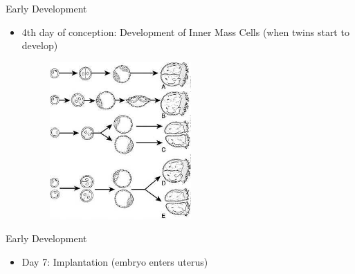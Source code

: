 \documentclass{beamer} %
\begin{document}
\begin{frame}{Early Development}
\begin{itemize}
    \item 4th day of conception: Development of Inner Mass Cells (when twins start to develop)
    \begin{figure}
        \centering
        \includegraphics[width=\textwidth,height=6cm]{twindevelopment.jpg}
    \end{figure}
\end{itemize}
\end{frame}
\begin{frame}{Early Development}
\begin{itemize}
    \item Day 7: Implantation (embryo enters uterus)
\end{itemize}
\end{frame}
\end{document}
